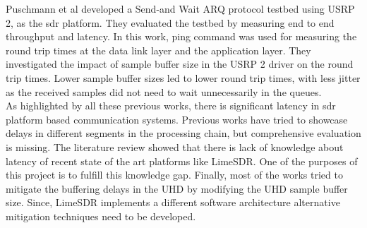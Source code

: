  
Puschmann et al \cite{puschmann_implementation_2011} developed a Send-and Wait \ac{ARQ} protocol  testbed using USRP 2, as the \ac{sdr} platform.
They evaluated the testbed by measuring end to end throughput and latency.
In this work, ping command was used for measuring the round trip times at the data link layer and the application layer.
They investigated the impact of sample buffer size in the USRP 2 driver on the round trip times.
Lower sample buffer sizes led to lower round trip times, with less jitter as the received samples did not need to wait unnecessarily in the queues.\\

As highlighted by all these previous works, there is significant latency in \ac{sdr} platform based communication systems.
Previous works have tried to showcase delays in different segments in the processing chain, but comprehensive evaluation is missing.
The literature review showed that there is lack of knowledge about latency of recent state of the art platforms like LimeSDR.
One of the purposes of this project is to fulfill this knowledge gap.
Finally, most of the works tried to mitigate the buffering delays in the \ac{UHD} by modifying the UHD sample buffer size.
Since, LimeSDR implements a different software architecture alternative mitigation techniques need to be developed. 


